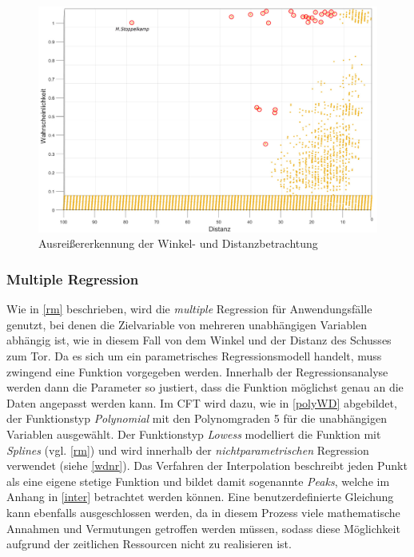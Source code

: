 \begin{figure}[H]
\centering
\includegraphics[scale=0.33]{se-wa-jpg/outlierWD}
\caption{Ausreißererkennung der Winkel- und Distanzbetrachtung}
\label{outlierWD}
\end{figure}

\subsubsection{Multiple Regression}
Wie in \vref{rm} beschrieben, wird die \textit{multiple} Regression für Anwendungsfälle genutzt, bei denen die Zielvariable von mehreren unabhängigen Variablen abhängig ist, wie in diesem Fall von dem Winkel und der Distanz des Schusses zum Tor. Da es sich um ein parametrisches Regressionsmodell handelt, muss zwingend eine Funktion vorgegeben werden. Innerhalb der Regressionsanalyse werden dann die Parameter so justiert, dass die Funktion möglichst genau an die Daten angepasst werden kann. Im CFT wird dazu, wie in \vref{polyWD} abgebildet, der Funktionstyp \textit{Polynomial} mit den Polynomgraden \textsf{5} für die unabhängigen Variablen ausgewählt. Der Funktionstyp \textit{Lowess} modelliert die Funktion mit \textit{Splines} (vgl. \vref{rm}) und wird innerhalb der \textit{nichtparametrischen} Regression verwendet (siehe \vref{wdnr}). Das Verfahren der Interpolation beschreibt jeden Punkt als eine eigene stetige Funktion und bildet damit sogenannte \textit{Peaks}, welche im Anhang in \vref{inter} betrachtet werden können.\enlargethispage{\baselineskip} Eine benutzerdefinierte Gleichung kann ebenfalls ausgeschlossen werden, da in diesem Prozess viele mathematische Annahmen und Vermutungen getroffen werden müssen, sodass diese Möglichkeit aufgrund der zeitlichen Ressourcen nicht zu realisieren ist.

